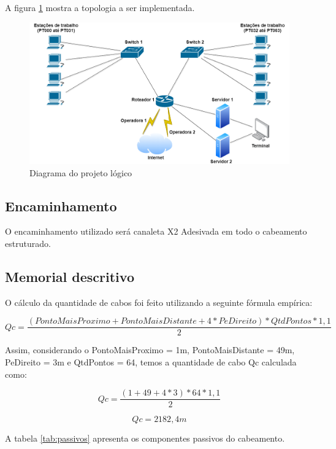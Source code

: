 \documentclass[	DIV=calc,%
							paper=a4,%
							fontsize=12pt,%
							onecolumn]{scrartcl}	 					%
\begin{document}
A figura \ref{topologia} mostra a topologia a ser implementada.

\begin{figure}
	\centering
	\includegraphics[width=\textwidth]{topologia}
	\caption{Diagrama do projeto lógico}
	\label{topologia}
\end{figure}


\subsection{Encaminhamento}

O encaminhamento utilizado será canaleta X2 Adesivada em todo o cabeamento estruturado.

\subsection{Memorial descritivo}

O cálculo da quantidade de cabos foi feito utilizando a seguinte fórmula empírica: 

\begin{equation}
Qc = \frac{(Ponto Mais Proximo + Ponto Mais Distante + 4*PeDireito)*QtdPontos*1,1}{2}
\end{equation}

Assim, considerando o PontoMaisProximo = 1m, PontoMaisDistante = 49m, PeDireito = 3m e QtdPontos = 64, temos a quantidade de cabo Qc calculada como:

\begin{equation}
Qc = \frac{(1 + 49 + 4*3)*64*1,1}{2}
\end{equation}

\begin{equation}
Qc = 2182,4 m
\end{equation}

A tabela \ref{tab:passivos} apresenta os componentes passivos do cabeamento.
\end{document}
